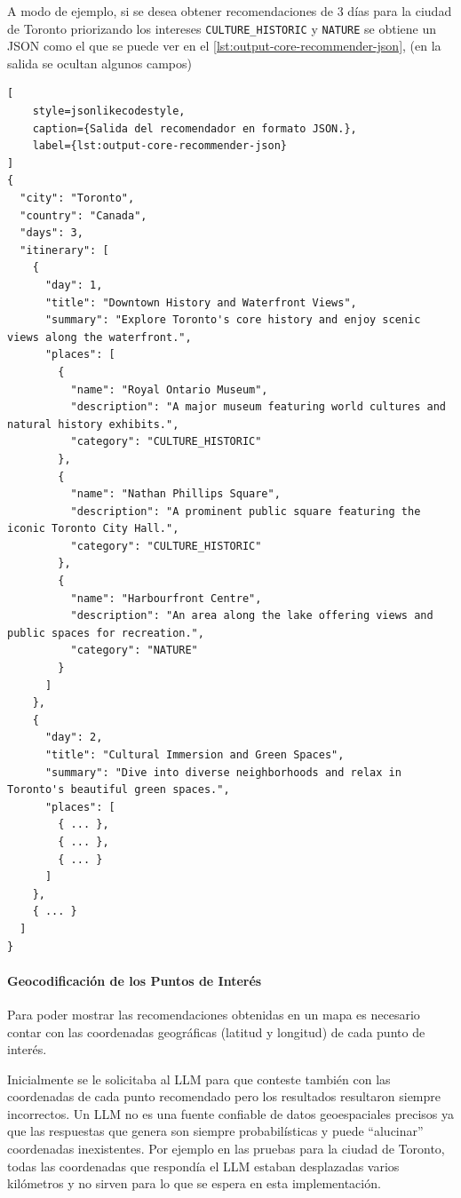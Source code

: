 A modo de ejemplo, si se desea obtener recomendaciones de 3 días para la ciudad de Toronto priorizando los intereses
\texttt{CULTURE\_HISTORIC} y \texttt{NATURE} se obtiene un JSON como el que se puede ver en el
\autoref{lst:output-core-recommender-json}, (en la salida se ocultan algunos campos)

\begin{lstlisting}[
    style=jsonlikecodestyle,
    caption={Salida del recomendador en formato JSON.},
    label={lst:output-core-recommender-json}
]
{
  "city": "Toronto",
  "country": "Canada",
  "days": 3,
  "itinerary": [
    {
      "day": 1,
      "title": "Downtown History and Waterfront Views",
      "summary": "Explore Toronto's core history and enjoy scenic views along the waterfront.",
      "places": [
        {
          "name": "Royal Ontario Museum",
          "description": "A major museum featuring world cultures and natural history exhibits.",
          "category": "CULTURE_HISTORIC"
        },
        {
          "name": "Nathan Phillips Square",
          "description": "A prominent public square featuring the iconic Toronto City Hall.",
          "category": "CULTURE_HISTORIC"
        },
        {
          "name": "Harbourfront Centre",
          "description": "An area along the lake offering views and public spaces for recreation.",
          "category": "NATURE"
        }
      ]
    },
    {
      "day": 2,
      "title": "Cultural Immersion and Green Spaces",
      "summary": "Dive into diverse neighborhoods and relax in Toronto's beautiful green spaces.",
      "places": [
        { ... },
        { ... },
        { ... }
      ]
    },
    { ... }
  ]
}
\end{lstlisting}

\paragraph{Geocodificación de los Puntos de Interés}

Para poder mostrar las recomendaciones obtenidas en un mapa es necesario contar con las coordenadas geográficas
(latitud y longitud) de cada punto de interés.

Inicialmente se le solicitaba al LLM para que conteste también con las coordenadas de cada punto recomendado
pero los resultados resultaron siempre incorrectos.
Un LLM no es una fuente confiable de datos geoespaciales precisos ya que las respuestas que genera son siempre
probabilísticas y puede ``alucinar'' coordenadas inexistentes.
Por ejemplo en las pruebas para la ciudad de Toronto, todas las coordenadas que respondía el LLM estaban
desplazadas varios kilómetros y no sirven para lo que se espera en esta implementación.


